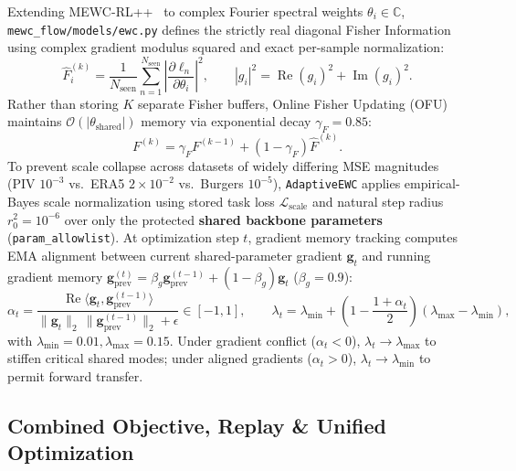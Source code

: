 \documentclass[11pt,a4paper]{article}
\begin{document}
Extending MEWC-RL++~\cite{hasan2026mewcrlpp} to complex Fourier spectral weights $\theta_i \in \mathbb{C}$, \texttt{mewc\_flow/models/ewc.py} defines the strictly real diagonal Fisher Information using complex gradient modulus squared and exact per-sample normalization:
\begin{equation}
\hat{F}_i^{(k)} = \frac{1}{N_{\text{seen}}} \sum_{n=1}^{N_{\text{seen}}} \left|\frac{\partial \ell_n}{\partial \theta_i}\right|^2, \qquad |g_i|^2 = \operatorname{Re}(g_i)^2 + \operatorname{Im}(g_i)^2.
\end{equation}
Rather than storing $K$ separate Fisher buffers, Online Fisher Updating (OFU) maintains $\mathcal{O}(|\theta_{\text{shared}}|)$ memory via exponential decay $\gamma_F = 0.85$:
\begin{equation}
F^{(k)} = \gamma_F F^{(k-1)} + (1 - \gamma_F)\hat{F}^{(k)}.
\end{equation}
To prevent scale collapse across datasets of widely differing MSE magnitudes (PIV $10^{-3}$ vs.\ ERA5 $2 \times 10^{-2}$ vs.\ Burgers $10^{-5}$), \texttt{AdaptiveEWC} applies empirical-Bayes scale normalization using stored task loss $\mathcal{L}_{\text{scale}}$ and natural step radius $r_0^2 = 10^{-6}$ over only the protected \textbf{shared backbone parameters} (\texttt{param\_allowlist}). At optimization step $t$, gradient memory tracking computes EMA alignment between current shared-parameter gradient $\mathbf{g}_t$ and running gradient memory $\mathbf{g}_{\text{prev}}^{(t)} = \beta_g \mathbf{g}_{\text{prev}}^{(t-1)} + (1 - \beta_g)\mathbf{g}_t$ ($\beta_g = 0.9$):
\begin{equation}
\alpha_t = \frac{\operatorname{Re}\langle \mathbf{g}_t, \mathbf{g}_{\text{prev}}^{(t-1)} \rangle}{\|\mathbf{g}_t\|_2 \, \|\mathbf{g}_{\text{prev}}^{(t-1)}\|_2 + \epsilon} \in [-1, 1], \qquad \lambda_t = \lambda_{\min} + \left(1 - \frac{1 + \alpha_t}{2}\right)(\lambda_{\max} - \lambda_{\min}),
\end{equation}
with $\lambda_{\min} = 0.01, \lambda_{\max} = 0.15$. Under gradient conflict ($\alpha_t < 0$), $\lambda_t \to \lambda_{\max}$ to stiffen critical shared modes; under aligned gradients ($\alpha_t > 0$), $\lambda_t \to \lambda_{\min}$ to permit forward transfer.

\subsection{Combined Objective, Replay \& Unified Optimization}
\end{document}
